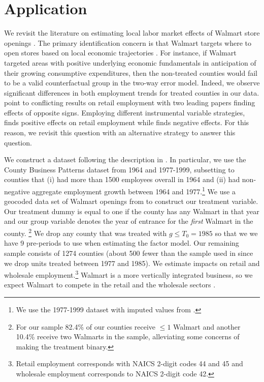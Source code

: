 \section{Application}\label{sec:application}

We revisit the literature on estimating local labor market effects of Walmart store openings \citep{basker2005job, neumark2008effects, volpe2022economic}. The primary identification concern is that Walmart targets where to open stores based on local economic trajectories \citep{neumark2008effects}. For instance, if Walmart targeted areas with positive underlying economic fundamentals in anticipation of their growing consumptive expenditures, then the non-treated counties would fail to be a valid counterfactual group in the two-way error model. Indeed, we observe significant differences in both employment trends for treated counties in our data. \citet{volpe2022economic} point to conflicting results on retail employment with two leading papers finding effects of opposite signs. Employing different instrumental variable strategies, \citet{basker2005job} finds positive effects on retail employment while \citet{neumark2008effects} finds negative effects. For this reason, we revisit this question with an alternative strategy to answer this question. 

We construct a dataset following the description in \citet{basker2005job}. In particular, we use the County Business Patterns dataset from 1964 and 1977-1999, subsetting to counties that (i) had more than 1500 employees overall in 1964 and (ii) had non-negative aggregate employment growth between 1964 and 1977.\footnote{We use the 1977-1999 dataset with imputed values from \citet{eckert2021imputing}.} We use a geocoded data set of Walmart openings from \citet{arcidiacono2020competitive} to construct our treatment variable. Our treatment dummy is equal to one if the county has any Walmart in that year and our group variable denotes the year of entrance for the \textit{first} Walmart in the county. \footnote{For our sample 82.4\% of our counties receive $\leq 1$ Walmart and another 10.4\% receive two Walmarts in the sample, alleviating some concerns of making the treatment binary.} We drop any county that was treated with $g \leq T_0 = 1985$ so that we we have 9 pre-periods to use when estimating the factor model. Our remaining sample consists of 1274 counties (about 500 fewer than the sample used in \citet{basker2005job} since we drop units treated between 1977 and 1985). We estimate impacts on retail and wholesale employment.\footnote{Retail employment corresponds with NAICS 2-digit codes 44 and 45 and wholesale employment corresponds to NAICS 2-digit code 42.} Walmart is a more vertically integrated business, so we expect Walmart to compete in the retail and the wholesale sectors \citep{basker2005job}.

